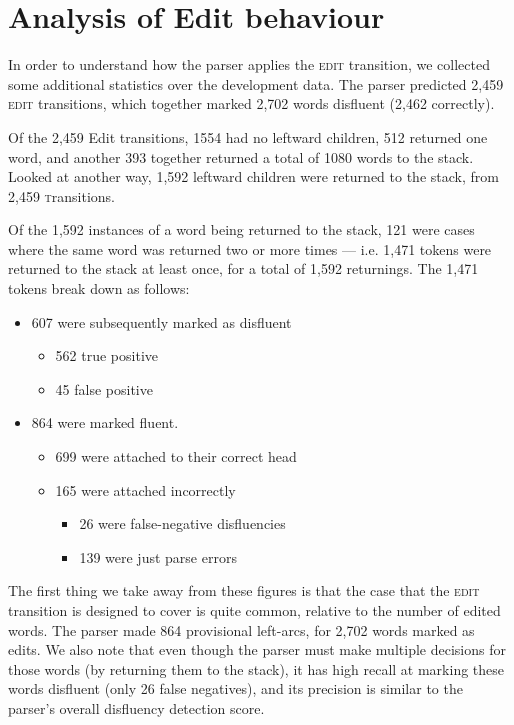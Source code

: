 \documentclass[11pt,letterpaper]{article}
\newcommand{\edittrans}{\textsc{edit}\xspace}
\begin{document}
\section{Analysis of Edit behaviour}

In order to understand how the parser applies the \edittrans transition, we
collected some additional statistics over the development data.
The parser predicted 2,459 \edittrans transitions,
which together marked 2,702
words disfluent (2,462 correctly).

Of the 2,459 Edit transitions, 1554 had no leftward children, 512 returned one word,
and another 393 together returned a total of 1080 words to the stack. Looked at
another way, 1,592 leftward children were returned to the stack, from
2,459 \textsc transitions.

Of the 1,592 instances of a word being returned to the stack, 121 were cases where
the same word was returned two or more times --- i.e. 1,471 tokens were returned
to the stack at least once, for a total of 1,592 returnings.
The 1,471 tokens break down as follows:
\vspace*{-0.5em}
\begin{itemize}
    \itemsep0ex
    \item 607 were subsequently marked as disfluent
        \begin{itemize}
            \itemsep0ex
            \item 562 true positive
            \item 45 false positive
        \end{itemize}
    \item 864 were marked fluent.
        \begin{itemize}
            \itemsep0ex
            \item 699 were attached to their correct head
            \item 165 were attached incorrectly
            \begin{itemize}
                \itemsep0ex
                \item 26 were false-negative disfluencies
                \item 139 were just parse errors
            \end{itemize}
        \end{itemize}
\end{itemize}

The first thing we take away from these figures is that the case that the \edittrans
transition is designed to cover is quite common, relative to the number of edited
words.  The parser made 864 provisional left-arcs, for 2,702 words marked as 
edits.  We also note that even though the parser must make multiple decisions for
those words (by returning them to the stack), it has high recall at marking these
words disfluent (only 26 false negatives), and its precision is similar to
the parser's overall disfluency detection score.
\end{document}
